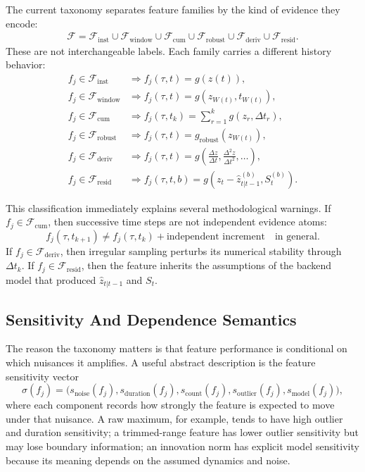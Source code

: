 \documentclass[11pt]{article}
\begin{document}
The current taxonomy separates feature families by the kind of evidence they
encode:
\begin{align}
\mathcal{F}
=
\mathcal{F}_{\mathrm{inst}}
\cup
\mathcal{F}_{\mathrm{window}}
\cup
\mathcal{F}_{\mathrm{cum}}
\cup
\mathcal{F}_{\mathrm{robust}}
\cup
\mathcal{F}_{\mathrm{deriv}}
\cup
\mathcal{F}_{\mathrm{resid}}.
\end{align}
These are not interchangeable labels. Each family carries a different history
behavior:
\begin{align}
f_j \in \mathcal{F}_{\mathrm{inst}}
&\Rightarrow
f_j(\tau,t) = g(z(t)), \\
f_j \in \mathcal{F}_{\mathrm{window}}
&\Rightarrow
f_j(\tau,t) = g(z_{W(t)}, t_{W(t)}), \\
f_j \in \mathcal{F}_{\mathrm{cum}}
&\Rightarrow
f_j(\tau,t_k) = \sum_{r=1}^k g(z_r, \Delta t_r), \\
f_j \in \mathcal{F}_{\mathrm{robust}}
&\Rightarrow
f_j(\tau,t) = g_{\mathrm{robust}}(z_{W(t)}), \\
f_j \in \mathcal{F}_{\mathrm{deriv}}
&\Rightarrow
f_j(\tau,t) = g\!\left(\frac{\Delta z}{\Delta t}, \frac{\Delta^2 z}{\Delta t^2}, \dots\right), \\
f_j \in \mathcal{F}_{\mathrm{resid}}
&\Rightarrow
f_j(\tau,t,b) = g(z_t - \hat{z}_{t|t-1}^{(b)}, S_t^{(b)}).
\end{align}

This classification immediately explains several methodological warnings. If
\(f_j \in \mathcal{F}_{\mathrm{cum}}\), then successive time steps are not
independent evidence atoms:
\begin{equation}
f_j(\tau,t_{k+1})
\neq
f_j(\tau,t_k) + \text{independent increment}
\quad \text{in general}.
\end{equation}
If \(f_j \in \mathcal{F}_{\mathrm{deriv}}\), then irregular sampling perturbs
its numerical stability through \(\Delta t_k\). If
\(f_j \in \mathcal{F}_{\mathrm{resid}}\), then the feature inherits the
assumptions of the backend model that produced \(\hat{z}_{t|t-1}\) and \(S_t\).

\subsection*{Sensitivity And Dependence Semantics}
The reason the taxonomy matters is that feature performance is conditional on
which nuisances it amplifies. A useful abstract description is the feature
sensitivity vector
\begin{equation}
\sigma(f_j)
=
\bigl(
s_{\mathrm{noise}}(f_j),
s_{\mathrm{duration}}(f_j),
s_{\mathrm{count}}(f_j),
s_{\mathrm{outlier}}(f_j),
s_{\mathrm{model}}(f_j)
\bigr),
\end{equation}
where each component records how strongly the feature is expected to move under
that nuisance. A raw maximum, for example, tends to have high outlier and
duration sensitivity; a trimmed-range feature has lower outlier sensitivity but
may lose boundary information; an innovation norm has explicit model
sensitivity because its meaning depends on the assumed dynamics and noise.
\end{document}

